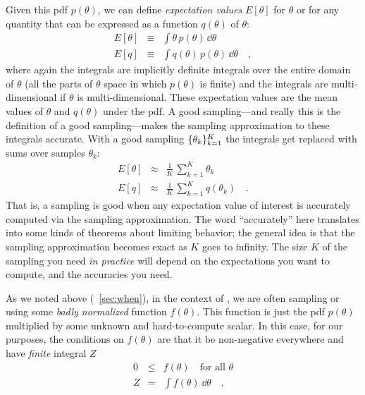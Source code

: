 \documentclass[12pt,twoside,pdftex]{article}
\newcommand{\MCMC}{\acronym{MCMC}}
\newcommand{\pars}{\theta}
\begin{document}
Given this pdf $p(\pars)$, we can define \emph{expectation values} $E[\pars]$
for $\pars$ or for any quantity that can be expressed as a function $q(\pars)$
of $\pars$:
\begin{eqnarray}
E[\pars] &\equiv& \int \pars\,p(\pars)\,\dd \pars
\\
E[q] &\equiv& \int q(\pars)\,p(\pars)\,\dd \pars
\quad ,
\end{eqnarray}
where again the integrals are implicitly definite integrals over the
entire domain
of $\pars$ (all the parts of $\pars$ space in which $p(\pars)$ is finite) and the
integrals are multi-dimensional if $\pars$ is multi-dimensional.
These expectation values are the mean values of $\pars$ and $q(\pars)$ under
the pdf.  A good sampling---and really this is the definition of a good
sampling---makes the sampling approximation to these integrals
accurate.
With a good sampling $\setof{\pars_k}_{k=1}^K$ the integrals get replaced
with sums over samples $\pars_k$:
\begin{eqnarray}
E[\pars] &\approx& \frac{1}{K}\,\sum_{k=1}^K \pars_k
\\
E[q] &\approx& \frac{1}{K}\,\sum_{k=1}^K q(\pars_k)
\quad .
\end{eqnarray}
That is, a sampling is good when any expectation value of interest is
accurately computed via the sampling approximation.
The word ``accurately'' here translates into some kinds of theorems
about limiting behavior; the general idea is that the sampling
approximation becomes exact as $K$ goes to infinity.
The size $K$ of the sampling you need \emph{in practice} will depend
on the expectations you want to compute, and the accuracies you need.

As we noted above (\sectionname~\ref{sec:when}), in the context of \MCMC, we are often sampling or
using some \emph{badly normalized} function $f(\pars)$.
This function is just the pdf $p(\pars)$ multiplied by some unknown and
hard-to-compute scalar.
In this case, for our purposes, the conditions on $f(\pars)$ are that it
be non-negative everywhere and have \emph{finite} integral $Z$
\begin{eqnarray}
0 &\leq& f(\pars) \quad \mbox{for all $\pars$}
\\
Z &=& \int f(\pars)\,\dd \pars
\quad .
\end{eqnarray}
\end{document}

